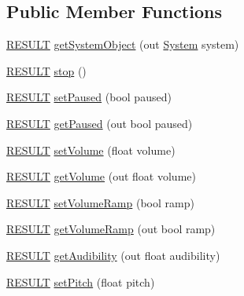 \subsection*{Public Member Functions}
\begin{DoxyCompactItemize}
\item 
\hyperlink{namespace_f_m_o_d_a305d1176ef3f8c8815861a60407ac33d}{R\+E\+S\+U\+LT} \hyperlink{class_f_m_o_d_1_1_channel_control_a2cdf328c605e3e0a4e567f72722e16c3}{get\+System\+Object} (out \hyperlink{class_f_m_o_d_1_1_system}{System} system)
\item 
\hyperlink{namespace_f_m_o_d_a305d1176ef3f8c8815861a60407ac33d}{R\+E\+S\+U\+LT} \hyperlink{class_f_m_o_d_1_1_channel_control_ae7825e5305c127d4a9a856460839c7d9}{stop} ()
\item 
\hyperlink{namespace_f_m_o_d_a305d1176ef3f8c8815861a60407ac33d}{R\+E\+S\+U\+LT} \hyperlink{class_f_m_o_d_1_1_channel_control_aab392876c307238b40444d323bb5a78c}{set\+Paused} (bool paused)
\item 
\hyperlink{namespace_f_m_o_d_a305d1176ef3f8c8815861a60407ac33d}{R\+E\+S\+U\+LT} \hyperlink{class_f_m_o_d_1_1_channel_control_a7cbe5f2fbd3b159f7a62d0164dc4cca8}{get\+Paused} (out bool paused)
\item 
\hyperlink{namespace_f_m_o_d_a305d1176ef3f8c8815861a60407ac33d}{R\+E\+S\+U\+LT} \hyperlink{class_f_m_o_d_1_1_channel_control_aa47164360aab2989605a38952f5e8d8a}{set\+Volume} (float volume)
\item 
\hyperlink{namespace_f_m_o_d_a305d1176ef3f8c8815861a60407ac33d}{R\+E\+S\+U\+LT} \hyperlink{class_f_m_o_d_1_1_channel_control_af5dc7eb6b7ba0d8eba0365dccc905dc0}{get\+Volume} (out float volume)
\item 
\hyperlink{namespace_f_m_o_d_a305d1176ef3f8c8815861a60407ac33d}{R\+E\+S\+U\+LT} \hyperlink{class_f_m_o_d_1_1_channel_control_af632bb7c0d713a2193e0fa6b966c401e}{set\+Volume\+Ramp} (bool ramp)
\item 
\hyperlink{namespace_f_m_o_d_a305d1176ef3f8c8815861a60407ac33d}{R\+E\+S\+U\+LT} \hyperlink{class_f_m_o_d_1_1_channel_control_a41128cb5b81af5f232ba29abaa6a71d5}{get\+Volume\+Ramp} (out bool ramp)
\item 
\hyperlink{namespace_f_m_o_d_a305d1176ef3f8c8815861a60407ac33d}{R\+E\+S\+U\+LT} \hyperlink{class_f_m_o_d_1_1_channel_control_afb1ce1ec5d0ca2d6d2c685662571fafd}{get\+Audibility} (out float audibility)
\item 
\hyperlink{namespace_f_m_o_d_a305d1176ef3f8c8815861a60407ac33d}{R\+E\+S\+U\+LT} \hyperlink{class_f_m_o_d_1_1_channel_control_a6eba3aa3466dd389065c885799da44f6}{set\+Pitch} (float pitch)

\end{DoxyCompactItemize}
